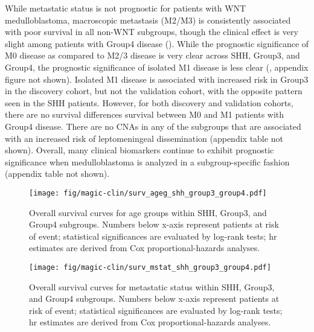 While metastatic status is not prognostic for patients with WNT medulloblastoma, macroscopic metastasis (M2/M3) is consistently associated with poor survival in all non-WNT subgroups, though the clinical effect is very slight among patients with Group4 disease ().  While the prognostic significance of M0 disease as compared to M2/3 disease is very clear across SHH, Group3, and Group4, the prognostic significance of isolated M1 disease is less clear (, appendix figure not shown). Isolated M1 disease is associated with increased risk in Group3 in the discovery cohort, but not the validation cohort, with the opposite pattern seen in the SHH patients. However, for both discovery and validation cohorts, there are no survival differences survival between M0 and M1 patients with Group4 disease. There are no CNAs in any of the subgroups that are associated with an increased risk of leptomeningeal dissemination (appendix table not shown). Overall, many clinical biomarkers continue to exhibit prognostic significance when medulloblastoma is analyzed in a subgroup-specific fashion (appendix table not shown).

\bigskip

\begin{figure}[ht]
	\begin{center}
		\texttt{[image: fig/magic-clin/surv\_ageg\_shh\_group3\_group4.pdf]}
	\end{center}
	\caption[Overall survival curves for age groups within SHH, Group3, and Group4 subgroups]
	{
	Overall survival curves for age groups within SHH, Group3, and Group4 subgroups.
	Numbers below x-axis represent patients at risk of event; statistical significances are evaluated by log-rank tests; \gls{hr} estimates are derived from Cox proportional-hazards analyses.
	}
	\label{fig:surv_ageg_shh_group3_group4}
\end{figure}

\begin{figure}[ht]
	\begin{center}
		\texttt{[image: fig/magic-clin/surv\_mstat\_shh\_group3\_group4.pdf]}
	\end{center}
	\caption[Overall survival curves for metastatic status within SHH, Group3, and Group4 subgroups]
	{
	Overall survival curves for metastatic status within SHH, Group3, and Group4 subgroups.
	Numbers below x-axis represent patients at risk of event; statistical significances are evaluated by log-rank tests; \gls{hr} estimates are derived from Cox proportional-hazards analyses.
	}
	\label{fig:surv_mstat_shh_group3_group4}
\end{figure}

